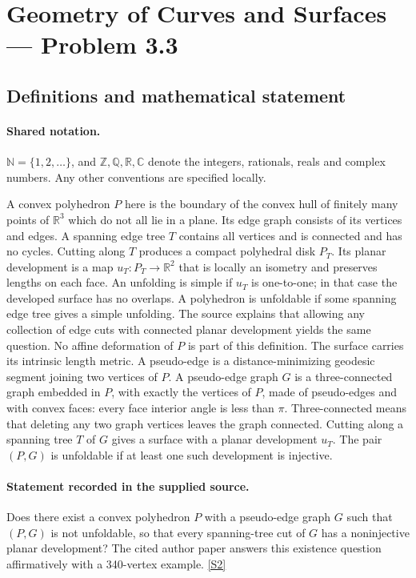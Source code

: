\documentclass[11pt]{article}
\newcommand{\sref}[2]{\hyperlink{source:#1:#2}{[S#2]}}
\begin{document}
\section{Geometry of Curves and Surfaces — Problem 3.3}\label{statement}

\subsection{Definitions and mathematical statement}

\paragraph{Shared notation.}$\mathbb N=\{1,2,\ldots\}$, and $\mathbb Z,\mathbb Q,\mathbb R,\mathbb C$ denote the integers, rationals, reals and complex numbers. Any other conventions are specified locally.


A convex polyhedron $P$ here is the boundary of the convex hull of finitely many points of $\mathbb R^3$ which do not all lie in a plane. Its edge graph consists of its vertices and edges. A spanning edge tree $T$ contains all vertices and is connected and has no cycles. Cutting along $T$ produces a compact polyhedral disk $P_T$. Its planar development is a map $u_T:P_T\to\mathbb R^2$ that is locally an isometry and preserves lengths on each face. An unfolding is simple if $u_T$ is one-to-one; in that case the developed surface has no overlaps. A polyhedron is unfoldable if some spanning edge tree gives a simple unfolding. The source explains that allowing any collection of edge cuts with connected planar development yields the same question. No affine deformation of $P$ is part of this definition. The surface carries its intrinsic length metric. A pseudo-edge is a distance-minimizing geodesic segment joining two vertices of $P$. A pseudo-edge graph $G$ is a three-connected graph embedded in $P$, with exactly the vertices of $P$, made of pseudo-edges and with convex faces: every face interior angle is less than $\pi$. Three-connected means that deleting any two graph vertices leaves the graph connected. Cutting along a spanning tree $T$ of $G$ gives a surface with a planar development $u_T$. The pair $(P,G)$ is unfoldable if at least one such development is injective.
\paragraph{Statement recorded in the supplied source.}
Does there exist a convex polyhedron $P$ with a pseudo-edge graph $G$ such that $(P,G)$ is not unfoldable, so that every spanning-tree cut of $G$ has a noninjective planar development? The cited author paper answers this existence question affirmatively with a 340-vertex example. \sref{statement}{2}
\end{document}
